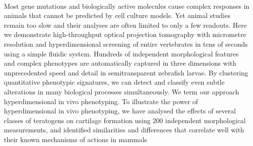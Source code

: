 {{\begin{enumerate}
\\ \aabstract
Most gene mutations and biologically active molecules cause complex responses in animals that cannot be predicted by cell culture models. Yet animal studies remain too slow and their analyses are often limited to only a few readouts. Here we demonstrate high-throughput optical projection tomography with micrometre resolution and hyperdimensional screening of entire vertebrates in tens of seconds using a simple fluidic system. Hundreds of independent morphological features and complex phenotypes are automatically captured in three dimensions with unprecedented speed and detail in semitransparent zebrafish larvae. By clustering quantitative phenotypic signatures, we can detect and classify even subtle alterations in many biological processes simultaneously. We term our approach hyperdimensional in vivo phenotyping. To illustrate the power of hyperdimensional in vivo phenotyping, we have analysed the effects of several classes of teratogens on cartilage formation using 200 independent morphological measurements, and identified similarities and differences that correlate well with their known mechanisms of actions in mammals


\end{enumerate}}}

